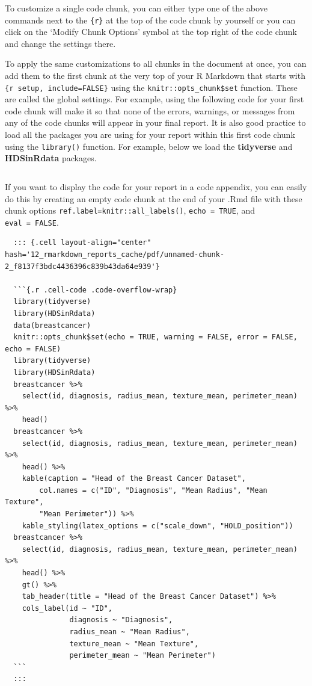 \documentclass[
  letterpaper,
]{krantz}
\begin{document}
To customize a single code chunk, you can either type one of the above
commands next to the \texttt{\{r\}} at the top of the code chunk by
yourself or you can click on the `Modify Chunk Options' symbol at the
top right of the code chunk and change the settings there.

To apply the same customizations to all chunks in the document at once,
you can add them to the first chunk at the very top of your R Markdown
that starts with
\texttt{\textasciigrave{}\textasciigrave{}\textasciigrave{}\{r\ setup,\ include=FALSE\}}
using the \texttt{knitr::opts\_chunk\$set} function. These are called
the global settings. For example, using the following code for your
first code chunk will make it so that none of the errors, warnings, or
messages from any of the code chunks will appear in your final report.
It is also good practice to load all the packages you are using for your
report within this first code chunk using the \texttt{library()}
function. For example, below we load the \textbf{tidyverse} and
\textbf{HDSinRdata} packages.

\begin{verbatim}
\end{verbatim}

If you want to display the code for your report in a code appendix, you
can easily do this by creating an empty code chunk at the end of your
.Rmd file with these chunk options
\texttt{ref.label=knitr::all\_labels()}, \texttt{echo\ =\ TRUE}, and
\texttt{eval\ =\ FALSE}.

\begin{verbatim}
  ::: {.cell layout-align="center" hash='12_rmarkdown_reports_cache/pdf/unnamed-chunk-2_f8137f3bdc4436396c839b43da64e939'}
  
  ```{.r .cell-code .code-overflow-wrap}
  library(tidyverse)
  library(HDSinRdata)
  data(breastcancer)
  knitr::opts_chunk$set(echo = TRUE, warning = FALSE, error = FALSE, echo = FALSE)
  library(tidyverse)
  library(HDSinRdata)
  breastcancer %>% 
    select(id, diagnosis, radius_mean, texture_mean, perimeter_mean) %>%   
    head()
  breastcancer %>% 
    select(id, diagnosis, radius_mean, texture_mean, perimeter_mean) %>% 
    head() %>% 
    kable(caption = "Head of the Breast Cancer Dataset", 
        col.names = c("ID", "Diagnosis", "Mean Radius", "Mean Texture", 
        "Mean Perimeter")) %>%   
    kable_styling(latex_options = c("scale_down", "HOLD_position"))
  breastcancer %>% 
    select(id, diagnosis, radius_mean, texture_mean, perimeter_mean) %>% 
    head() %>% 
    gt() %>%
    tab_header(title = "Head of the Breast Cancer Dataset") %>%
    cols_label(id ~ "ID", 
               diagnosis ~ "Diagnosis", 
               radius_mean ~ "Mean Radius", 
               texture_mean ~ "Mean Texture",
               perimeter_mean ~ "Mean Perimeter")
  ```
  :::
\end{verbatim}
\end{document}
